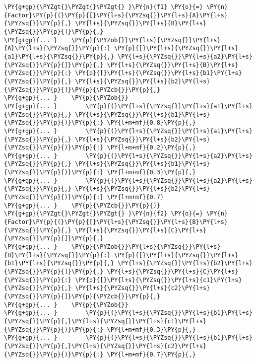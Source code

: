\begin{fulllineitems}
\begin{Verbatim}[commandchars=\\\{\}]
\PY{g+gp}{\PYZgt{}\PYZgt{}\PYZgt{} }\PY{n}{f1} \PY{o}{=} \PY{n}{Factor}\PY{p}{(}\PY{p}{[}\PY{l+s}{\PYZsq{}}\PY{l+s}{A}\PY{l+s}{\PYZsq{}}\PY{p}{,} \PY{l+s}{\PYZsq{}}\PY{l+s}{B}\PY{l+s}{\PYZsq{}}\PY{p}{]}\PY{p}{,}
\PY{g+gp}{... }    \PY{p}{\PYZob{}}\PY{l+s}{\PYZsq{}}\PY{l+s}{A}\PY{l+s}{\PYZsq{}}\PY{p}{:} \PY{p}{[}\PY{l+s}{\PYZsq{}}\PY{l+s}{a1}\PY{l+s}{\PYZsq{}}\PY{p}{,} \PY{l+s}{\PYZsq{}}\PY{l+s}{a2}\PY{l+s}{\PYZsq{}}\PY{p}{]}\PY{p}{,} \PY{l+s}{\PYZsq{}}\PY{l+s}{B}\PY{l+s}{\PYZsq{}}\PY{p}{:} \PY{p}{[}\PY{l+s}{\PYZsq{}}\PY{l+s}{b1}\PY{l+s}{\PYZsq{}}\PY{p}{,} \PY{l+s}{\PYZsq{}}\PY{l+s}{b2}\PY{l+s}{\PYZsq{}}\PY{p}{]}\PY{p}{\PYZcb{}}\PY{p}{,}
\PY{g+gp}{... }    \PY{p}{\PYZob{}}
\PY{g+gp}{... }        \PY{p}{(}\PY{l+s}{\PYZsq{}}\PY{l+s}{a1}\PY{l+s}{\PYZsq{}}\PY{p}{,} \PY{l+s}{\PYZsq{}}\PY{l+s}{b1}\PY{l+s}{\PYZsq{}}\PY{p}{)}\PY{p}{:} \PY{l+m+mf}{0.8}\PY{p}{,}
\PY{g+gp}{... }        \PY{p}{(}\PY{l+s}{\PYZsq{}}\PY{l+s}{a1}\PY{l+s}{\PYZsq{}}\PY{p}{,} \PY{l+s}{\PYZsq{}}\PY{l+s}{b2}\PY{l+s}{\PYZsq{}}\PY{p}{)}\PY{p}{:} \PY{l+m+mf}{0.2}\PY{p}{,}
\PY{g+gp}{... }        \PY{p}{(}\PY{l+s}{\PYZsq{}}\PY{l+s}{a2}\PY{l+s}{\PYZsq{}}\PY{p}{,} \PY{l+s}{\PYZsq{}}\PY{l+s}{b1}\PY{l+s}{\PYZsq{}}\PY{p}{)}\PY{p}{:} \PY{l+m+mf}{0.3}\PY{p}{,}
\PY{g+gp}{... }        \PY{p}{(}\PY{l+s}{\PYZsq{}}\PY{l+s}{a2}\PY{l+s}{\PYZsq{}}\PY{p}{,} \PY{l+s}{\PYZsq{}}\PY{l+s}{b2}\PY{l+s}{\PYZsq{}}\PY{p}{)}\PY{p}{:} \PY{l+m+mf}{0.7}
\PY{g+gp}{... }    \PY{p}{\PYZcb{}}\PY{p}{)}
\PY{g+gp}{\PYZgt{}\PYZgt{}\PYZgt{} }\PY{n}{f2} \PY{o}{=} \PY{n}{Factor}\PY{p}{(}\PY{p}{[}\PY{l+s}{\PYZsq{}}\PY{l+s}{B}\PY{l+s}{\PYZsq{}}\PY{p}{,} \PY{l+s}{\PYZsq{}}\PY{l+s}{C}\PY{l+s}{\PYZsq{}}\PY{p}{]}\PY{p}{,}
\PY{g+gp}{... }    \PY{p}{\PYZob{}}\PY{l+s}{\PYZsq{}}\PY{l+s}{B}\PY{l+s}{\PYZsq{}}\PY{p}{:} \PY{p}{[}\PY{l+s}{\PYZsq{}}\PY{l+s}{b1}\PY{l+s}{\PYZsq{}}\PY{p}{,} \PY{l+s}{\PYZsq{}}\PY{l+s}{b2}\PY{l+s}{\PYZsq{}}\PY{p}{]}\PY{p}{,} \PY{l+s}{\PYZsq{}}\PY{l+s}{C}\PY{l+s}{\PYZsq{}}\PY{p}{:} \PY{p}{[}\PY{l+s}{\PYZsq{}}\PY{l+s}{c1}\PY{l+s}{\PYZsq{}}\PY{p}{,} \PY{l+s}{\PYZsq{}}\PY{l+s}{c2}\PY{l+s}{\PYZsq{}}\PY{p}{]}\PY{p}{\PYZcb{}}\PY{p}{,}
\PY{g+gp}{... }    \PY{p}{\PYZob{}}
\PY{g+gp}{... }        \PY{p}{(}\PY{l+s}{\PYZsq{}}\PY{l+s}{b1}\PY{l+s}{\PYZsq{}}\PY{p}{,}\PY{l+s}{\PYZsq{}}\PY{l+s}{c1}\PY{l+s}{\PYZsq{}}\PY{p}{)}\PY{p}{:} \PY{l+m+mf}{0.3}\PY{p}{,}
\PY{g+gp}{... }        \PY{p}{(}\PY{l+s}{\PYZsq{}}\PY{l+s}{b1}\PY{l+s}{\PYZsq{}}\PY{p}{,}\PY{l+s}{\PYZsq{}}\PY{l+s}{c2}\PY{l+s}{\PYZsq{}}\PY{p}{)}\PY{p}{:} \PY{l+m+mf}{0.7}\PY{p}{,}

\end{Verbatim}
\end{fulllineitems}
